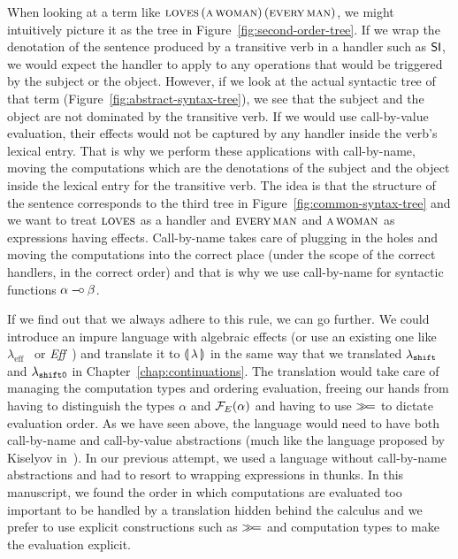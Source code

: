 When looking at a term like
$\textsc{loves}\,(\textsc{a}\,\textsc{woman})\,(\textsc{every}\,\textsc{man})$,
we might intuitively picture it as the tree in
Figure~\ref{fig:second-order-tree}. If we wrap the denotation of the
sentence produced by a transitive verb in a handler such as $\textsf{SI}$, we would
expect the handler to apply to any operations that would be triggered by
the subject or the object. However, if we look at the actual syntactic tree
of that term (Figure~\ref{fig:abstract-syntax-tree}), we see that the
subject and the object are not dominated by the transitive verb. If we
would use call-by-value evaluation, their effects would not be captured by
any handler inside the verb's lexical entry. That is why we perform these
applications with call-by-name, moving the computations which are the
denotations of the subject and the object inside the lexical entry for the
transitive verb. The idea is that the structure of the sentence corresponds
to the third tree in Figure~\ref{fig:common-syntax-tree} and we want to
treat $\textsc{loves}$ as a handler and $\textsc{every}\,\textsc{man}$ and
$\textsc{a}\,\textsc{woman}$ as expressions having effects. Call-by-name
takes care of plugging in the holes and moving the computations into the
correct place (under the scope of the correct handlers, in the correct
order) and that is why we use call-by-name for syntactic functions
$\alpha \mathbin{{-}\mkern-3.5mu{\circ}} \beta$.

If we find out that we always adhere to this rule, we can go further. We
could introduce an impure language with algebraic effects (or use an
existing one like $\lambda_{\mathrm{eff}}$~\cite{kammar2013handlers} or
\emph{Eff}~\cite{bauer2012programming}) and translate it to
$\llparenthesis \, \lambda \, \rrparenthesis$ in the same way that we translated $\lambda_{\mathtt{shift}}$ and
$\lambda_{\mathtt{shift0}}$ in Chapter~\ref{chap:continuations}. The translation
would take care of managing the computation types and ordering evaluation,
freeing our hands from having to distinguish the types $\alpha$ and
$\mathcal{F}_E(\alpha)$ and having to use $\mathbin{\gg\!=}$ to dictate evaluation order. As
we have seen above, the language would need to have both call-by-name and
call-by-value abstractions (much like the language proposed by Kiselyov
in~\cite{kiselyov2008call}). In our previous attempt, we used a language
without call-by-name abstractions and had to resort to wrapping expressions
in thunks. In this manuscript, we found the order in which computations are
evaluated too important to be handled by a translation hidden behind the
calculus and we prefer to use explicit constructions such as $\mathbin{\gg\!=}$ and
computation types to make the evaluation explicit.


